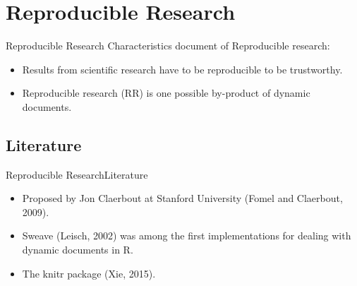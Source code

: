 \documentclass[10pt]{beamer}
\newcommand{\chref}[2]{%
  \href{#1}{{\usebeamercolor[bg]{AAUsidebar}#2}}%
}
\begin{document}

\section{Reproducible Research}
\begin{frame}{Reproducible Research}{}  
	Characteristics document of Reproducible research:
	\begin{itemize}
		\item<1->Results from scientific research have to be reproducible to be trustworthy.
		\item<2->Reproducible research (RR) is one possible by-product of dynamic documents.
	\end{itemize}
\end{frame}

\subsection{Literature}
\begin{frame}{Reproducible Research}{Literature}
	\begin{itemize}
		\item<1->Proposed by Jon Claerbout at Stanford University (Fomel and Claerbout, 2009).
		\item<2->Sweave (Leisch, 2002) was among the first implementations for dealing with dynamic documents in R.
		\item<3->The knitr package (Xie, 2015).
	\end{itemize}
\end{frame}
\end{document}
